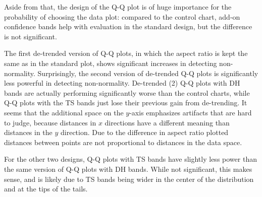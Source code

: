 \documentclass{article}\usepackage[]{graphicx}\usepackage[]{color}
\newcommand{\hh}[1]{{\color{magenta} #1}}
\begin{document}
\hh{Aside from that,} the design of the Q-Q plot is of huge importance for the probability of choosing the data plot: compared to the control chart, add-on confidence bands help with evaluation in the standard design, but the difference is not significant.  

\hh{The first de-trended version of Q-Q plots, in which the aspect ratio is kept the same as in the standard plot, shows significant increases in detecting non-normality. }
Surprisingly, the \hh{second version of} de-trended Q-Q plots is significantly less powerful in detecting non-normality. \hh{De-trended (2) Q-Q plots with DH bands are actually performing significantly worse than the control charts, while Q-Q plots with the TS bands just lose their previous gain from de-trending.} \hh{It seems that the additional space on the $y$-axis emphasizes artifacts that are hard to judge, because distances in $x$ directions have a different meaning than distances in the $y$ direction. Due to the difference in aspect ratio plotted distances between points are not proportional to distances in the data space.} 

\hh{For the other two designs, Q-Q plots with TS bands have slightly less power than the same version of Q-Q plots with DH bands. While not significant, this makes sense, and is likely due to TS bands being wider in the center of the distribution and at the tips of the tails.}
\end{document}
